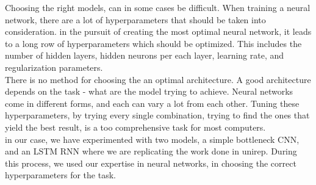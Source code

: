 Choosing the right models, can in some cases be difficult. When training a neural network, there are a lot of hyperparameters that should be taken into consideration. in the pursuit of creating the most optimal neural network, it leads to a long row of hyperparameters which should be optimized. This includes the number of hidden layers, hidden neurons per each layer, learning rate, and regularization parameters. \\

\noindent
There is no method for choosing the an optimal architecture. A good architecture depends on the task - what are the model trying to achieve. Neural networks come in different forms, and each can vary a lot from each other. Tuning these hyperparameters, by trying every single combination, trying to find the ones that yield the best result, is a too comprehensive task for most computers. \\

\noindent
in our case, we have experimented with two models, a simple bottleneck CNN, and an LSTM RNN where we are replicating the work done in unirep\cite{unirep}. During this process, we used our expertise in neural networks, in choosing the correct hyperparameters for the task.
